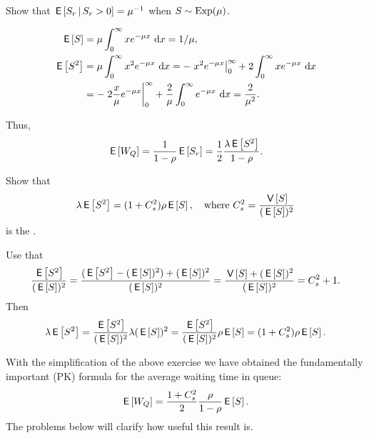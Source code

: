 \begin{exercise}
 Show that $\,\mathsf{E}\left[S_r\,\middle|\, S_r>0\right] = \mu^{-1}$ when $S\sim \operatorname{Exp}(\mu)$.
\begin{solution}
    \begin{align*}
\,\mathsf{E}\left[S\right] &= \mu \int_0^\infty x e^{-\mu x}\,\,\text{d}x = 1/\mu, \\
\,\mathsf{E}\left[S^2\right] 
&= \mu \int_0^\infty x^2 e^{- \mu x} \,\,\text{d}x = - \left. x^2 e^{-\mu x} \right|_0^\infty + 2 \int_0^\infty x e^{-\mu x} \, \,\text{d}x \\
&= -\left. 2\frac x \mu e^{-\mu x} \right|_0^\infty + \frac 2 \mu\int_0^\infty e^{-\mu x} \, \,\text{d}x =\frac2{\mu^2}.
    \end{align*}
\end{solution}
\end{exercise}

Thus, 
\begin{equation*} 
  \,\mathsf{E}\left[W_Q\right] = \frac1{1-\rho} \,\mathsf{E}\left[S_r\right] =\frac 1 2 \frac{\lambda \,\mathsf{E}\left[S^2\right]}{1-\rho}.
\end{equation*}

\begin{exercise}
Show that
\begin{equation}\label{eq:32}
  \lambda \,\mathsf{E}\left[S^2\right] = (1+C_s^2)\rho\,\mathsf{E}\left[S\right], \quad\text{where }
 C_s^2 = \frac{\,\mathsf{V}\left[S\right] }{(\,\mathsf{E}\left[S\right])^2}
\end{equation}
is the .
\begin{solution}
Use that 
\begin{equation*}
  \frac{\,\mathsf{E}\left[S^2\right]}{(\,\mathsf{E}\left[S\right])^2} = 
  \frac{(\,\mathsf{E}\left[S^2\right]-(\,\mathsf{E}\left[S\right])^2) + (\,\mathsf{E}\left[S\right])^2}{(\,\mathsf{E}\left[S\right])^2} =
  \frac{\,\mathsf{V}\left[S\right] + (\,\mathsf{E}\left[S\right])^2}{(\,\mathsf{E}\left[S\right])^2} =
  C_s^2 + 1.
\end{equation*}
Then
\begin{equation*}
  \lambda\,\mathsf{E}\left[S^2\right] = \frac{\,\mathsf{E}\left[S^2\right]}{(\,\mathsf{E}\left[S\right])^2} \lambda(\,\mathsf{E}\left[S\right])^2=
 \frac{\,\mathsf{E}\left[S^2\right]}{(\,\mathsf{E}\left[S\right])^2} \rho \,\mathsf{E}\left[S\right] = (1+C_s^2) \rho \,\mathsf{E}\left[S\right].
\end{equation*}
\end{solution}
\end{exercise}

With the simplification of the above exercise  we have obtained the fundamentally important  (PK) formula for the average waiting time in queue:
\begin{equation} \label{eq:710}
  \,\mathsf{E}\left[W_Q\right] =\frac{1 + C_s^2}2 \frac{\rho}{1-\rho}  \,\mathsf{E}\left[S\right].
\end{equation}
The problems below will clarify how useful this result is.

